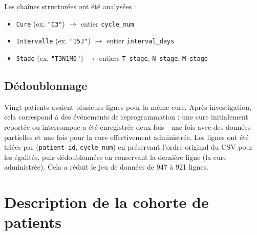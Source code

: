 \documentclass[12pt,a4paper]{report}
\begin{document}
Les chaînes structurées ont été analysées :
\begin{itemize}
  \item \texttt{Cure} (ex. \texttt{"C3"}) $\to$ entier \texttt{cycle\_num}
  \item \texttt{Intervalle} (ex. \texttt{"15J"}) $\to$ entier \texttt{interval\_days}
  \item \texttt{Stade} (ex. \texttt{"T3N1M0"}) $\to$ entiers \texttt{T\_stage}, \texttt{N\_stage}, \texttt{M\_stage}
\end{itemize}

\subsection{Dédoublonnage}

Vingt patients avaient plusieurs lignes pour la même cure. Après investigation, cela correspond à des événements de reprogrammation : une cure initialement reportée ou interrompue a été enregistrée deux fois---une fois avec des données partielles et une fois pour la cure effectivement administrée. Les lignes ont été triées par (\texttt{patient\_id}, \texttt{cycle\_num}) en préservant l'ordre original du CSV pour les égalités, puis dédoublonnées en conservant la dernière ligne (la cure administrée). Cela a réduit le jeu de données de 947 à 921 lignes.

\section{Description de la cohorte de patients}
\end{document}
